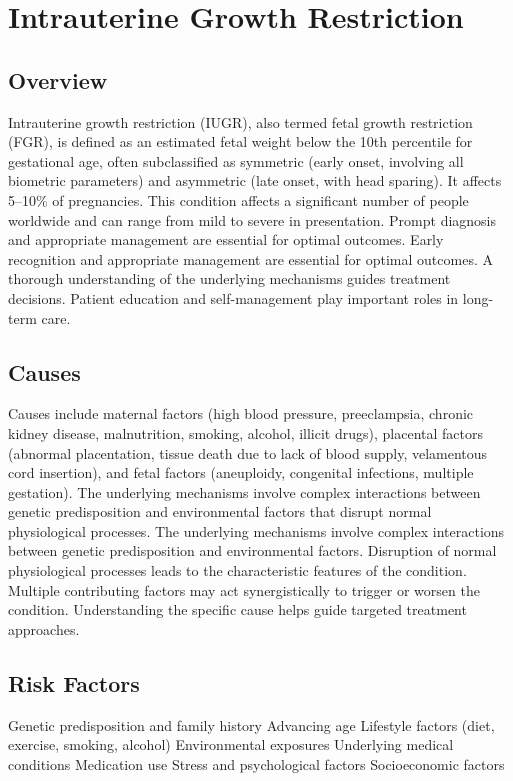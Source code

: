 \chapter{Intrauterine Growth Restriction}
\label{sec:Intrauterine Growth Restriction}

\section{Overview}
Intrauterine growth restriction (IUGR), also termed fetal growth restriction (FGR), is defined as an estimated fetal weight below the 10th percentile for gestational age, often subclassified as symmetric (early onset, involving all biometric parameters) and asymmetric (late onset, with head sparing). It affects 5--10\% of pregnancies. This condition affects a significant number of people worldwide and can range from mild to severe in presentation. Prompt diagnosis and appropriate management are essential for optimal outcomes. Early recognition and appropriate management are essential for optimal outcomes. A thorough understanding of the underlying mechanisms guides treatment decisions. Patient education and self-management play important roles in long-term care.
\section{Causes}
Causes include maternal factors (high blood pressure, preeclampsia, chronic kidney disease, malnutrition, smoking, alcohol, illicit drugs), placental factors (abnormal placentation, tissue death due to lack of blood supply, velamentous cord insertion), and fetal factors (aneuploidy, congenital infections, multiple gestation). The underlying mechanisms involve complex interactions between genetic predisposition and environmental factors that disrupt normal physiological processes. The underlying mechanisms involve complex interactions between genetic predisposition and environmental factors. Disruption of normal physiological processes leads to the characteristic features of the condition. Multiple contributing factors may act synergistically to trigger or worsen the condition. Understanding the specific cause helps guide targeted treatment approaches.
\section{Risk Factors}
Genetic predisposition and family history Advancing age Lifestyle factors (diet, exercise, smoking, alcohol) Environmental exposures Underlying medical conditions Medication use Stress and psychological factors Socioeconomic factors

